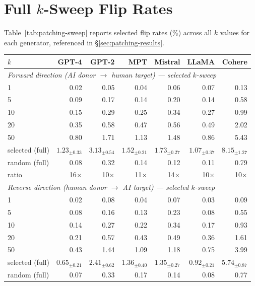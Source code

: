\documentclass[11pt]{article}
\begin{document}
\section{Full $k$-Sweep Flip Rates}
\label{app:patching-sweep}

Table~\ref{tab:patching-sweep} reports selected flip rates (\%) across all $k$ values for each generator, referenced in §\ref{sec:patching-results}.

\begin{table}[!htbp]
\centering
\small
\begin{tabular}{lrrrrrr}
\toprule
$k$ & GPT-4 & GPT-2 & MPT & Mistral & LLaMA & Cohere \\
\midrule
\multicolumn{7}{l}{\textit{Forward direction (AI donor $\to$ human target) --- selected $k$-sweep}} \\
1    & 0.02 & 0.05 & 0.04 & 0.06 & 0.07 & 0.13 \\
5    & 0.09 & 0.17 & 0.14 & 0.20 & 0.14 & 0.58 \\
10   & 0.15 & 0.29 & 0.25 & 0.34 & 0.27 & 0.99 \\
20   & 0.35 & 0.58 & 0.47 & 0.56 & 0.49 & 2.02 \\
50   & 0.80 & 1.71 & 1.13 & 1.48 & 0.86 & 5.43 \\
selected (full) & $1.23_{\pm 0.33}$ & $3.13_{\pm 0.54}$ & $1.52_{\pm 0.21}$ & $1.73_{\pm 0.27}$ & $1.07_{\pm 0.37}$ & $8.15_{\pm 1.27}$ \\
random (full)   & 0.08 & 0.32 & 0.14 & 0.12 & 0.11 & 0.79 \\
ratio           & 16$\times$ & 10$\times$ & 11$\times$ & 14$\times$ & 10$\times$ & 10$\times$ \\
\midrule
\multicolumn{7}{l}{\textit{Reverse direction (human donor $\to$ AI target) --- selected $k$-sweep}} \\
1    & 0.02 & 0.08 & 0.04 & 0.07 & 0.03 & 0.09 \\
5    & 0.08 & 0.16 & 0.13 & 0.23 & 0.08 & 0.55 \\
10   & 0.14 & 0.27 & 0.22 & 0.34 & 0.17 & 0.93 \\
20   & 0.21 & 0.57 & 0.43 & 0.49 & 0.36 & 1.61 \\
50   & 0.43 & 1.44 & 1.09 & 1.18 & 0.75 & 3.99 \\
selected (full) & $0.65_{\pm 0.21}$ & $2.41_{\pm 0.62}$ & $1.36_{\pm 0.40}$ & $1.35_{\pm 0.27}$ & $0.92_{\pm 0.21}$ & $5.74_{\pm 0.87}$ \\
random (full)   & 0.07 & 0.33 & 0.17 & 0.14 & 0.08 & 0.77 \\

\end{tabular}
\end{table}
\end{document}
